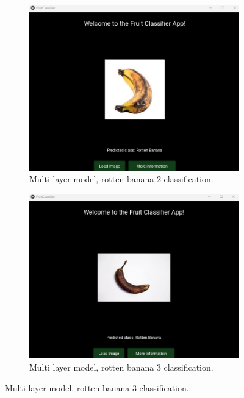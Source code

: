 \documentclass[conference]{IEEEtran}
\begin{document}
\begin{figure}[h]
    \hfill
    \begin{subfigure}[b]{0.48\linewidth}
        \centering
        \includegraphics[width=\linewidth]{Mlayer bananaR2.png}
        \caption{Multi layer model, rotten banana 2 classification.}
        \label{figFB}
    \end{subfigure}
    \hfill
    \begin{subfigure}[b]{0.48\linewidth}
        \centering
        \includegraphics[width=\linewidth]{Mlayer bananaR3.png}
        \caption{Multi layer model, rotten banana 3 classification.}
        \label{figFB}
    \end{subfigure}

\end{figure}
\end{document}
